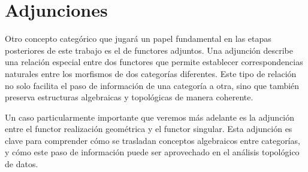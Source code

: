 \section{Adjunciones}
Otro concepto categórico que jugará un papel fundamental en las etapas posteriores de este trabajo es el de functores adjuntos. Una adjunción describe una relación especial entre dos functores que permite establecer correspondencias naturales entre los morfismos de dos categorías diferentes. Este tipo de relación no solo facilita el paso de información de una categoría a otra, sino que también preserva estructuras algebraicas y topológicas de manera coherente.

Un caso particularmente importante que veremos más adelante es la adjunción entre el functor realización geométrica y el functor singular. Esta adjunción es clave para comprender cómo se trasladan conceptos algebraicos entre categorías, y cómo este paso de información puede ser aprovechado en el análisis topológico de datos.

